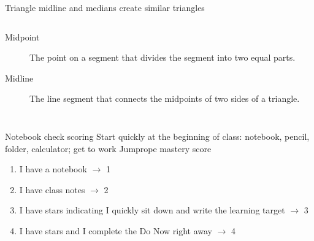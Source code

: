 \begin{frame}{Triangle midline and medians create similar triangles}
  \begin{columns}
      \begin{description}
        \item[Midpoint] The point on a segment that divides the segment into two equal parts.
        \item[Midline] The line segment that connects the midpoints of two sides of a triangle.
      \end{description}
    \begin{flushright}
    \end{flushright}
  \end{columns}
\end{frame}

\begin{frame}{Notebook check scoring}
  {Start quickly at the beginning of class: notebook, pencil, folder, calculator; get to work}
    Jumprope mastery score
    \begin{enumerate}
      \item I have a notebook $\rightarrow$ 1
      \item I have class notes $\rightarrow$ 2
      \item I have stars indicating I quickly sit down and write the learning target $\rightarrow$ 3
      \item I have stars and I complete the Do Now right away $\rightarrow$ 4
    \end{enumerate} \bigskip
\end{frame}


